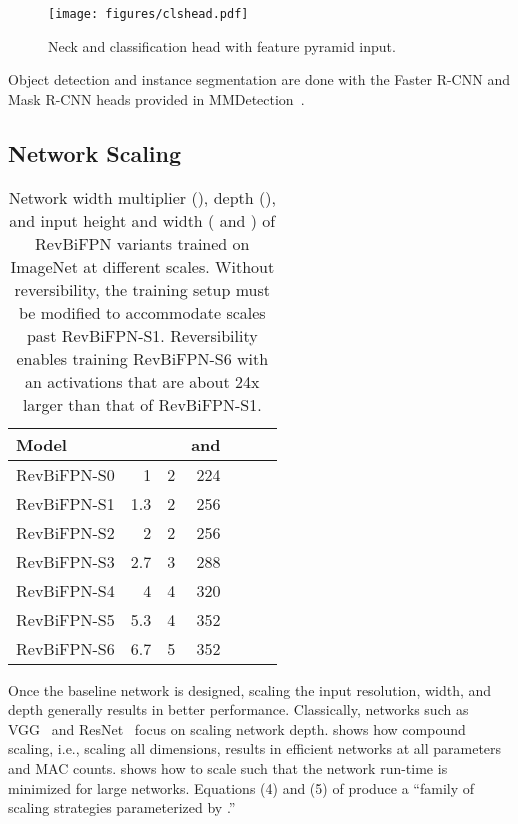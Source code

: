 \documentclass{article}
\begin{document}
\begin{figure}
    \centering
    \texttt{[image: figures/clshead.pdf]}
    \vskip 5pt
    \caption{Neck and classification head with feature pyramid input.}
    \label{fig:c_head}
    \vskip -10pt
\end{figure}


Object detection and instance segmentation are done with the Faster R-CNN and Mask R-CNN heads provided in MMDetection~\cite{chen2019mmdetection}.

\subsection{Network Scaling}
\label{sec:frbifpn:scaling}

\begin{table}
    \caption{
        Network width multiplier (), depth (), and input height and width ( and ) of RevBiFPN variants trained on ImageNet at different scales.
        Without reversibility, the training setup must be modified to accommodate scales past RevBiFPN-S1.
        Reversibility enables training RevBiFPN-S6 with an activations that are about 24x larger than that of RevBiFPN-S1.\protect\footnotemark
    }
    \vskip 10pt
    \centering
    \small
    \sc
    \begin{tabular}{lrrrrrr}
        \toprule
        Model       &  &  &  and  \\ \midrule
        RevBiFPN-S0 & 1     &   2 & 224 \\
        RevBiFPN-S1 & 1.3   &   2 & 256 \\
        RevBiFPN-S2 & 2     &   2 & 256 \\
        RevBiFPN-S3 & 2.7   &   3 & 288 \\
        RevBiFPN-S4 & 4     &   4 & 320 \\
        RevBiFPN-S5 & 5.3   &   4 & 352 \\
        RevBiFPN-S6 & 6.7   &   5 & 352 \\
        \bottomrule
    \end{tabular}
    \label{tab:scales}
    \vskip -10pt
\end{table}

Once the baseline network is designed, scaling the input resolution, width, and depth generally results in better performance.
Classically, networks such as VGG~\cite{simonyan2014very} and ResNet~\cite{he2016deep} focus on scaling network depth.
\citet{tan2019efficientnet} shows how compound scaling, i.e., scaling all dimensions, results in efficient networks at all parameters and MAC counts.
\citet{dollar2021fast} shows how to scale such that the network run-time is minimized for large networks.
Equations (4) and (5) of \citet{dollar2021fast} produce a ``family of scaling strategies parameterized by .''
\end{document}
